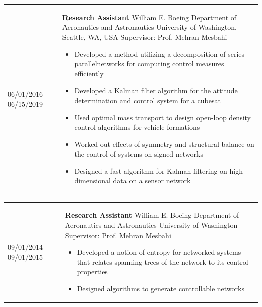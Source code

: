 \begin{tabular}{p{} p{}}
06/01/2016 -- 06/15/2019 & \textbf{Research Assistant} \newline
                        William E. Boeing Department of Aeronautics and Astronautics\newline
                        University of Washington, Seattle, WA, USA\newline
                        {Supervisor: Prof. Mehran Mesbahi} 
                        \begin{itemize}
                          \item Developed a method utilizing a decomposition of series-parallel\newline networks for computing control measures efficiently
                          \item Developed a Kalman filter algorithm for the attitude \newline determination and control system for a cubesat
                          \item Used optimal mass transport to design open-loop density \newline control algorithms for vehicle formations
                          \item Worked out effects of symmetry and structural balance on the \newline control of systems on signed networks
                          \item Designed a fast algorithm for Kalman filtering on \newline high-dimensional data on a sensor network
                        \end{itemize}
\end{tabular}
\begin{tabular}{p{} p{}}
09/01/2014 -- 09/01/2015 & \textbf{Research Assistant} \newline
                           William E. Boeing Department of Aeronautics and Astronautics\newline
                           University of Washington \newline
                           {Supervisor: Prof. Mehran Mesbahi} 
                           \begin{itemize}
                             \item Developed a notion of entropy for networked systems that \newline relates spanning trees of the network to its control properties
                             \item Designed algorithms to generate controllable  networks
                           \end{itemize}
\end{tabular}
\renewcommand{\arraystretch}{1.25}

